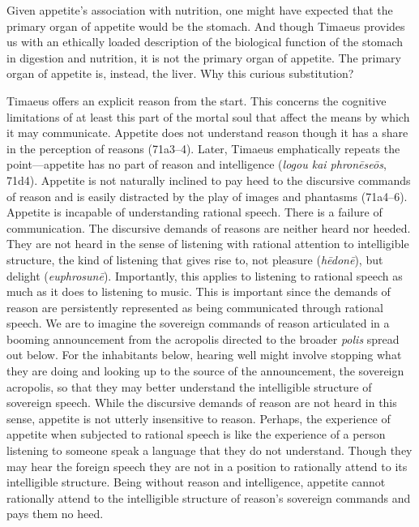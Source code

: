 Given appetite's association with nutrition, one might have expected that the primary organ of appetite would be the stomach. And though Timaeus provides us with an ethically loaded description of the biological function of the stomach in digestion and nutrition, it is not the primary organ of appetite. The primary organ of appetite is, instead, the liver. Why this curious substitution?

Timaeus offers an explicit reason from the start. This concerns the cognitive limitations of at least this part of the mortal soul that affect the means by which it may communicate. Appetite does not understand reason though it has a share in the perception of reasons (71a3--4). Later, Timaeus emphatically repeats the point---appetite has no part of reason and intelligence (\emph{logou kai phronēseōs}, 71d4). Appetite is not naturally inclined to pay heed to the discursive commands of reason and is easily distracted by the play of images and phantasms (71a4--6). Appetite is incapable of understanding rational speech. There is a failure of communication. The discursive demands of reasons are neither heard nor heeded. They are not heard in the sense of listening with rational attention to intelligible structure, the kind of listening that gives rise to, not pleasure (\emph{hēdonē}), but delight (\emph{euphrosunē}). Importantly, this applies to listening to rational speech as much as it does to listening to music. This is important since the demands of reason are persistently represented as being communicated through rational speech. We are to imagine the sovereign commands of reason articulated in a booming announcement from the acropolis directed to the broader \emph{polis} spread out below. For the inhabitants below, hearing well might involve stopping what they are doing and looking up to the source of the announcement, the sovereign acropolis, so that they may better understand the intelligible structure of sovereign speech. While the discursive demands of reason are not heard in this sense, appetite is not utterly insensitive to reason. Perhaps, the experience of appetite when subjected to rational speech is like the experience of a person listening to someone speak a language that they do not understand. Though they may hear the foreign speech they are not in a position to rationally attend to its intelligible structure. Being without reason and intelligence, appetite cannot rationally attend to the intelligible structure of reason's sovereign commands and pays them no heed.

